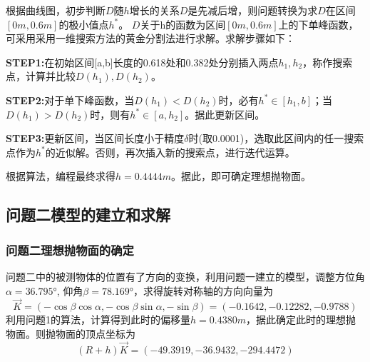 \documentclass[withoutpreface,bwprint]{cumcmthesis} %
\begin{document}
		根据曲线图，初步判断$D$随$h$增长的关系$D$是先减后增，则问题转换为求$D$在区间$[0m,0.6m]$的极小值点$h^{*}$。 $D$关于h的函数为区间$[0m,0.6m]$上的下单峰函数，可采用采用一维搜索方法的黄金分割法进行求解。求解步骤如下：
		
		 \textbf{STEP1:}在初始区间[a,b]长度的0.618处和0.382处分别插入两点$h_1,h_2$，称作搜索点，计算并比较$D(h_1),D(h_2)$。
		 
		 \textbf{STEP2:}对于单下峰函数，当$D(h_1)<D(h_2)$时，必有$h^*\in[h_1,b]$；当$D(h_1)>D(h_2)$时，则有$h^*\in[a,h_2]$。据此更新区间。
		 
		 \textbf{STEP3:}更新区间，当区间长度小于精度$\delta$时(取0.0001)，选取此区间内的任一搜索点作为$h^*$的近似解。否则，再次插入新的搜索点，进行迭代运算。
		
	
		根据算法，编程最终求得$h=0.4444m$。据此，即可确定理想抛物面。
		
	
	
	\subsection{问题二模型的建立和求解}
	\subsubsection{问题二理想抛物面的确定}
		问题二中的被测物体的位置有了方向的变换，利用问题一建立的模型，调整方位角$\alpha= 36.795°$, 仰角$\beta = 78.169°$，求得旋转对称轴的方向向量为
		\begin{equation}\label{K2}
		\vec{K}=\left( -\cos \beta \cos \alpha ,-\cos \beta \sin \alpha ,-\sin \beta \right) =(-0.1642,-0.12282,-0.9788)
		\end{equation}
		利用问题1的算法，计算得到此时的偏移量$h=0.4380m$，据此确定此时的理想抛物面。则抛物面的顶点坐标为
		\begin{equation}\label{ddzb}
		(R+h)\vec{K}=(-49.3919,-36.9432,-294.4472)
		\end{equation}
	
\end{document}

